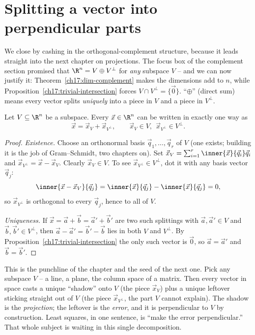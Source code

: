 \section{Splitting a vector into perpendicular parts}

We close by cashing in the orthogonal-complement structure, because it leads straight into the next
chapter on projections. The focus box of the complement section promised that $\R^n = V\oplus V^\perp$
for \emph{any} subspace $V$ -- and we can now justify it: Theorem~\ref{ch17:dim-complement} makes the
dimensions add to $n$, while Proposition~\ref{ch17:trivial-intersection} forces $V\cap V^\perp=\{\vec0\}$.
``$\oplus$'' (direct sum) means every vector splits \emph{uniquely} into a piece in
$V$ and a piece in $V^\perp$.

\begin{theorem}\label{ch17:orthog-decomp}
Let $V\subseteq\R^n$ be a subspace. Every $\vec x\in\R^n$ can be written in exactly one way as
\[
  \vec x = \vec x_V + \vec x_{V^\perp}, \qquad \vec x_V\in V,\ \ \vec x_{V^\perp}\in V^\perp .
\]
\end{theorem}

\begin{proof}
\emph{Existence.} Choose an orthonormal basis $\vec q_1,\dots,\vec q_r$ of $V$ (one exists; building
it is the job of Gram--Schmidt, two chapters on). Set $\vec x_V=\sum_{i=1}^r\inner{\vec x}{\vec q_i}\vec q_i$
and $\vec x_{V^\perp}=\vec x-\vec x_V$. Clearly $\vec x_V\in V$. To see $\vec x_{V^\perp}\in V^\perp$,
dot it with any basis vector $\vec q_j$:
\[
  \inner{\vec x-\vec x_V}{\vec q_j} = \inner{\vec x}{\vec q_j} - \inner{\vec x}{\vec q_j} = 0,
\]
so $\vec x_{V^\perp}$ is orthogonal to every $\vec q_j$, hence to all of $V$.

\emph{Uniqueness.} If $\vec x=\vec a+\vec b=\vec a'+\vec b'$ are two such splittings with
$\vec a,\vec a'\in V$ and $\vec b,\vec b'\in V^\perp$, then $\vec a-\vec a'=\vec b'-\vec b$ lies in
both $V$ and $V^\perp$. By Proposition~\ref{ch17:trivial-intersection} the only such vector is
$\vec 0$, so $\vec a=\vec a'$ and $\vec b=\vec b'$.
\end{proof}

\begin{intuitionbox}
This is the punchline of the chapter and the seed of the next one. Pick any subspace $V$ -- a line, a
plane, the column space of a matrix. Then every vector in space casts a unique ``shadow'' onto $V$
(the piece $\vec x_V$) plus a unique leftover sticking straight out of $V$ (the piece
$\vec x_{V^\perp}$, the part $V$ cannot explain). The shadow is the \emph{projection}; the leftover
is the \emph{error}, and it is perpendicular to $V$ by construction. Least squares, in one sentence,
is ``make the error perpendicular.'' That whole subject is waiting in this single decomposition.
\end{intuitionbox}

